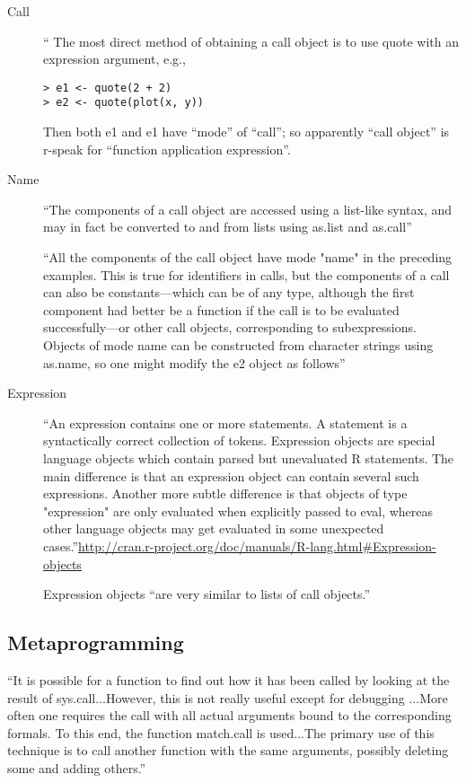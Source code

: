 \begin{description}
\item [Call] `` The most direct method of obtaining a call object is to use quote with an expression argument, e.g.,

\begin{verbatim}
> e1 <- quote(2 + 2)
> e2 <- quote(plot(x, y))
\end{verbatim}

Then both e1 and e1 have ``mode'' of ``call''; so apparently ``call
object'' is r-speak for ``function application expression''.

\item [Name]  ``The components of a call object are accessed using a list-like syntax, and may in fact be converted to and from lists using as.list and as.call''

``All the components of the call object have mode "name" in the preceding examples. This is true for identifiers in calls, but the components of a call can also be constants—which can be of any type, although the first component had better be a function if the call is to be evaluated successfully—or other call objects, corresponding to subexpressions. Objects of mode name can be constructed from character strings using as.name, so one might modify the e2 object as follows''

\item [Expression]  ``An expression contains one or more statements. A statement is a syntactically correct collection of tokens. Expression objects are special language objects which contain parsed but unevaluated R statements. The main difference is that an expression object can contain several such expressions. Another more subtle difference is that objects of type "expression" are only evaluated when explicitly passed to eval, whereas other language objects may get evaluated in some unexpected cases.''\url{http://cran.r-project.org/doc/manuals/R-lang.html#Expression-objects}

Expression objects ``are very similar to lists of call objects.''

\end{description}


\subsection{Metaprogramming}
\label{sect:rmetapgm}


``It is possible for a function to find out how it has been called by looking at the result of sys.call...However, this is not really useful except for debugging ...More often one requires the call with all actual arguments bound to the corresponding formals. To this end, the function match.call is used...The primary use of this technique is to call another function with the same arguments, possibly deleting some and adding others.''

